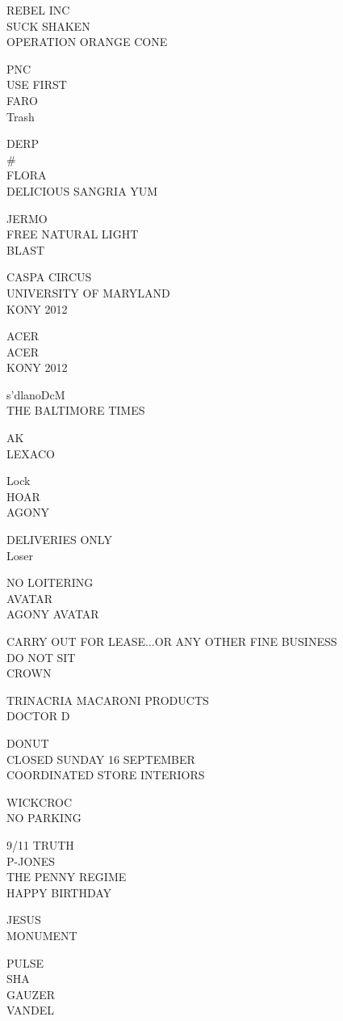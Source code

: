 \documentclass[10pt,letterpaper]{article}
\begin{document}
REBEL INC\\
SUCK SHAKEN\\
OPERATION ORANGE CONE

PNC\\
USE FIRST\\
FARO\\
Trash

DERP\\
\#\\
FLORA\\
DELICIOUS SANGRIA YUM

JERMO\\
FREE NATURAL LIGHT\\
BLAST

CASPA CIRCUS\\
UNIVERSITY OF MARYLAND\\
KONY 2012

ACER\\
ACER\\
KONY 2012

s'dlanoDcM\\
THE BALTIMORE TIMES

AK\\
LEXACO

Lock\\
HOAR\\
AGONY

DELIVERIES ONLY\\
Loser

NO LOITERING\\
AVATAR\\
AGONY AVATAR

CARRY OUT FOR LEASE...OR ANY OTHER FINE BUSINESS\\
DO NOT SIT\\
CROWN

TRINACRIA MACARONI PRODUCTS\\
DOCTOR D

DONUT\\
CLOSED SUNDAY 16 SEPTEMBER\\
COORDINATED STORE INTERIORS

WICKCROC\\
NO PARKING

9/11 TRUTH\\
P{-}JONES\\
THE PENNY REGIME\\
HAPPY BIRTHDAY

JESUS\\
MONUMENT

PULSE\\
SHA\\
GAUZER\\
VANDEL
\end{document}

